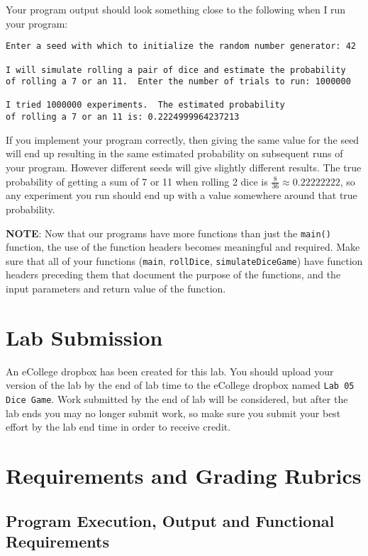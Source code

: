 \documentclass[11pt]{article}
\begin{document}
Your program output should look something close to the following when I
run your program:


\begin{verbatim}
Enter a seed with which to initialize the random number generator: 42

I will simulate rolling a pair of dice and estimate the probability
of rolling a 7 or an 11.  Enter the number of trials to run: 1000000

I tried 1000000 experiments.  The estimated probability
of rolling a 7 or an 11 is: 0.2224999964237213
\end{verbatim}

If you implement your program correctly, then giving the same value
for the seed will end up resulting in the same estimated probability
on subsequent runs of your program.  However different seeds will give
slightly different results.  The true probability of getting a sum of
7 or 11 when rolling 2 dice is $\frac{8}{36} \approx 0.22222222$, so
any experiment you run should end up with a value somewhere around
that true probability.

\textbf{NOTE}: Now that our programs have more functions than just the
\verb~main()~ function, the use of the function headers becomes meaningful
and required.  Make sure that all of your functions (\verb~main~,
\verb~rollDice~, \verb~simulateDiceGame~) have function headers preceding them
that document the purpose of the functions, and the input parameters
and return value of the function.
\section*{Lab Submission}
\label{sec-4}


An eCollege dropbox has been created for this lab.  You should
upload your version of the lab by the end of lab time to the eCollege
dropbox named \verb~Lab 05 Dice Game~.  Work submitted by the end
of lab will be considered, but after the lab ends you may no longer
submit work, so make sure you submit your best effort by the lab end
time in order to receive credit.
\section*{Requirements and Grading Rubrics}
\label{sec-5}
\subsection*{Program Execution, Output and Functional Requirements}
\label{sec-5-1}
\end{document}
